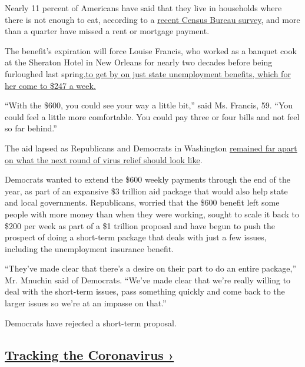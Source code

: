 Nearly 11 percent of Americans have said that they live in households
where there is not enough to eat, according to a
\href{https://www.census.gov/programs-surveys/household-pulse-survey/data.html?utm_campaign=20200727mspuls1ccdtanl\&utm_medium=email\&utm_source=govdelivery}{recent
Census Bureau survey}, and more than a quarter have missed a rent or
mortgage payment.

The benefit's expiration will force Louise Francis, who worked as a
banquet cook at the Sheraton Hotel in New Orleans for nearly two decades
before being furloughed last
spring,\href{https://www.nytimes.com/2020/07/30/business/economy/q2-gdp-coronavirus-economy.html}{to
get by on just state unemployment benefits, which for her come to \$247
a week.}

``With the \$600, you could see your way a little bit,'' said Ms.
Francis, 59. ``You could feel a little more comfortable. You could pay
three or four bills and not feel so far behind.''

The aid lapsed as Republicans and Democrats in Washington
\href{https://www.nytimes.com/2020/07/28/us/politics/coronavirus-relief-bills-house-senate.html}{remained
far apart on what the next round of virus relief should look like}.

Democrats wanted to extend the \$600 weekly payments through the end of
the year, as part of an expansive \$3 trillion aid package that would
also help state and local governments. Republicans, worried that the
\$600 benefit left some people with more money than when they were
working, sought to scale it back to \$200 per week as part of a \$1
trillion proposal and have begun to push the prospect of doing a
short-term package that deals with just a few issues, including the
unemployment insurance benefit.

``They've made clear that there's a desire on their part to do an entire
package,'' Mr. Mnuchin said of Democrats. ``We've made clear that we're
really willing to deal with the short-term issues, pass something
quickly and come back to the larger issues so we're at an impasse on
that.''

Democrats have rejected a short-term proposal.

\hypertarget{tracking-the-coronavirus-}{%
\subsection{\texorpdfstring{\href{https://www.nytimes.com/interactive/2020/us/coronavirus-us-cases.html}{Tracking
the Coronavirus
›}}{Tracking the Coronavirus ›}}\label{tracking-the-coronavirus-}}

